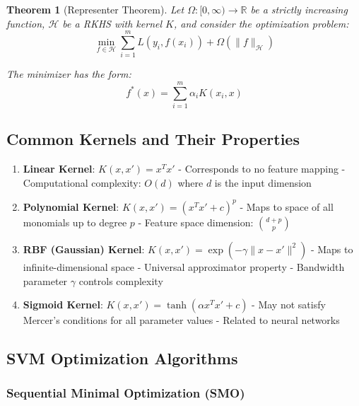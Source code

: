 \documentclass[12pt, a4paper]{article}
\newtheorem{theorem}{Theorem}
\begin{document}
\begin{theorem}[Representer Theorem]
Let $\Omega: [0, \infty) \to \mathbb{R}$ be a strictly increasing function, $\mathcal{H}$ be a RKHS with kernel $K$, and consider the optimization problem:
\begin{equation}
\min_{f \in \mathcal{H}} \sum_{i=1}^m L(y_i, f(x_i)) + \Omega(\|f\|_{\mathcal{H}})
\end{equation}

The minimizer has the form:
\begin{equation}
f^*(x) = \sum_{i=1}^m \alpha_i K(x_i, x)
\end{equation}
\end{theorem}

\subsection{Common Kernels and Their Properties}

\begin{enumerate}
\item \textbf{Linear Kernel}: $K(x, x') = x^T x'$
   - Corresponds to no feature mapping
   - Computational complexity: $O(d)$ where $d$ is the input dimension

\item \textbf{Polynomial Kernel}: $K(x, x') = (x^T x' + c)^p$
   - Maps to space of all monomials up to degree $p$
   - Feature space dimension: $\binom{d+p}{p}$

\item \textbf{RBF (Gaussian) Kernel}: $K(x, x') = \exp(-\gamma \|x - x'\|^2)$
   - Maps to infinite-dimensional space
   - Universal approximator property
   - Bandwidth parameter $\gamma$ controls complexity

\item \textbf{Sigmoid Kernel}: $K(x, x') = \tanh(\alpha x^T x' + c)$
   - May not satisfy Mercer's conditions for all parameter values
   - Related to neural networks
\end{enumerate}

\subsection{SVM Optimization Algorithms}

\subsubsection{Sequential Minimal Optimization (SMO)}
\end{document}
